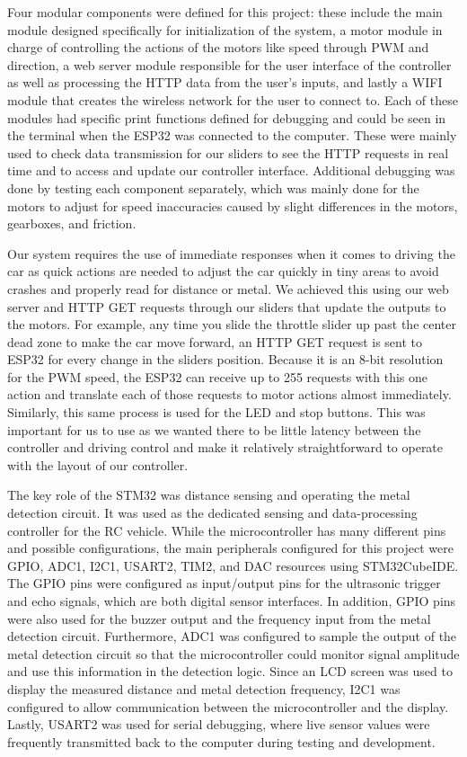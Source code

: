 \documentclass[11pt]{article}
\begin{document}
Four modular components were defined for this project: these include the main module designed specifically for initialization of the system, a motor module in charge of controlling the actions of the motors like speed through PWM and direction, a web server module responsible for the user interface of the controller as well as processing the HTTP data from the user’s inputs, and lastly a WIFI module that creates the wireless network for the user to connect to. Each of these modules had specific print functions defined for debugging and could be seen in the terminal when the ESP32 was connected to the computer. These were mainly used to check data transmission for our sliders to see the HTTP requests in real time and to access and update our controller interface. Additional debugging was done by testing each component separately, which was mainly done for the motors to adjust for speed inaccuracies caused by slight differences in the motors, gearboxes, and friction.

Our system requires the use of immediate responses when it comes to driving the car as quick actions are needed to adjust the car quickly in tiny areas to avoid crashes and properly read for distance or metal. We achieved this using our web server and HTTP GET requests through our sliders that update the outputs to the motors. For example, any time you slide the throttle slider up past the center dead zone to make the car move forward, an HTTP GET request is sent to ESP32 for every change in the sliders position. Because it is an 8-bit resolution for the PWM speed, the ESP32 can receive up to 255 requests with this one action and translate each of those requests to motor actions almost immediately. Similarly, this same process is used for the LED and stop buttons. This was important for us to use as we wanted there to be little latency between the controller and driving control and make it relatively straightforward to operate with the layout of our controller.

The key role of the STM32 was distance sensing and operating the metal detection circuit. It was used as the dedicated sensing and data-processing controller for the RC vehicle. While the microcontroller has many different pins and possible configurations, the main peripherals configured for this project were GPIO, ADC1, I2C1, USART2, TIM2, and DAC resources using STM32CubeIDE. The GPIO pins were configured as input/output pins for the ultrasonic trigger and echo signals, which are both digital sensor interfaces. In addition, GPIO pins were also used for the buzzer output and the frequency input from the metal detection circuit. Furthermore, ADC1 was configured to sample the output of the metal detection circuit so that the microcontroller could monitor signal amplitude and use this information in the detection logic. Since an LCD screen was used to display the measured distance and metal detection frequency, I2C1 was configured to allow communication between the microcontroller and the display. Lastly, USART2 was used for serial debugging, where live sensor values were frequently transmitted back to the computer during testing and development.
\end{document}

